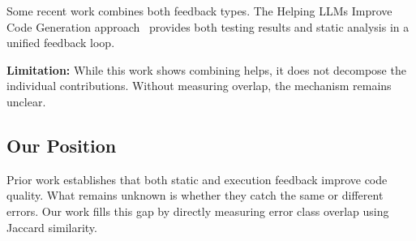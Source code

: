 Some recent work combines both feedback types. The Helping LLMs Improve Code Generation approach~\cite{HelpingLLMs2024} provides both testing results and static analysis in a unified feedback loop.

\textbf{Limitation:} While this work shows combining helps, it does not decompose the individual contributions. Without measuring overlap, the mechanism remains unclear.

\subsection{Our Position}

Prior work establishes that both static and execution feedback improve code quality. What remains unknown is whether they catch the same or different errors. Our work fills this gap by directly measuring error class overlap using Jaccard similarity.

